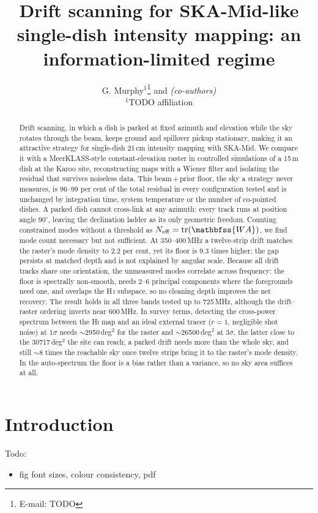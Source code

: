\documentclass[a4paper,fleqn,usenatbib]{mnras}
\title[Drift scanning is information-limited]{Drift scanning for SKA-Mid-like
single-dish intensity mapping: an information-limited regime}
\author[G. Murphy et al.]{
G. Murphy$^{1}$\thanks{E-mail: TODO}
and \textit{(co-authors)}
\\
$^{1}$TODO affiliation
}
\begin{document}
\maketitle

\begin{abstract}
Drift scanning, in which a dish is parked at fixed azimuth and elevation while the sky rotates through the beam, keeps ground and spillover pickup stationary, making it an attractive strategy for single-dish 21\,cm intensity mapping with SKA-Mid. We compare it with a MeerKLASS-style constant-elevation raster in controlled simulations of a 15\,m dish at the Karoo site, reconstructing maps with a Wiener filter and isolating the residual that survives noiseless data. This beam\,+\,prior floor, the sky a strategy never measures, is 96--99 per cent of the total residual in every configuration tested and is unchanged by integration time, system temperature or the number of co-pointed dishes. A parked dish cannot cross-link at any azimuth: every track runs at position angle $90^\circ$, leaving the declination ladder as its only geometric freedom. Counting constrained modes without a threshold as $N_\mathrm{eff}=\mathrm{tr}(\mathbfss{WA})$, we find mode count necessary but not sufficient. At 350--400\,MHz a twelve-strip drift matches the raster's mode density to 2.2 per cent, yet its floor is 9.3 times higher; the gap persists at matched depth and is not explained by angular scale. Because all drift tracks share one orientation, the unmeasured modes correlate across frequency: the floor is spectrally non-smooth, needs 2--6 principal components where the foregrounds need one, and overlaps the H\,\textsc{i} subspace, so no cleaning depth improves the net recovery. The result holds in all three bands tested up to 725\,MHz, although the drift--raster ordering inverts near 600\,MHz. In survey terms, detecting the cross-power spectrum between the \textsc{Hi} map and an ideal external tracer ($r = 1$, negligible shot noise) at $1\sigma$ needs $\sim$\num{2950}\,deg$^2$ for the raster and $\sim$\num{26500}\,deg$^2$ at $3\sigma$, the latter close to the \num{30717}\,deg$^2$ the site can reach; a parked drift needs more than the whole sky, and still $\sim8$ times the reachable sky once twelve strips bring it to the raster's mode density. In the auto-spectrum the floor is a bias rather than a variance, so no sky area suffices at all.
\end{abstract}

\section{Introduction}
Todo:
\begin{itemize}
    \item fig font sizes, colour consistency, pdf
\end{itemize}
\end{document}
